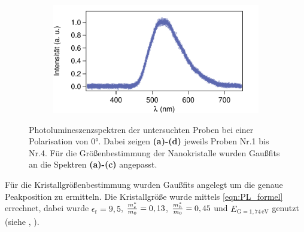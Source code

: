 \begin{figure}[H]
\begin{subfigure}{0.49\textwidth}
        \caption{}
        \label{fig:A3}
    \end{subfigure}
    \begin{subfigure}{0.49\textwidth}
        \includegraphics[width=\textwidth]{bilder/Nr4_Pol0.pdf}
        \caption{}
        \label{fig:A4}
    \end{subfigure}
    \caption{Photolumineszenzspektren der untersuchten Proben bei einer Polarisation von 0°. Dabei zeigen \textbf{(a)-(d)} jeweils Proben Nr.1 bis Nr.4. Für die Größenbestimmung der Nanokristalle wurden Gaußfits an die Spektren \textbf{(a)-(c)} angepasst.}
    \label{fig:Pol0}
\end{figure}
Für die Kristallgrößenbestimmung wurden Gaußfits angelegt um die genaue Peakposition zu ermitteln.
Die Kristallgröße wurde mittels \autoref{eqn:PL_formel} errechnet, dabei wurde $\epsilon_{\text{r}}=9,5$, $\frac{m_e^*}{m_{\text0}}=0,13$, $\frac{m_h^*}{m_{\text0}}=0,45$ und $E_{\text{G}=1,74\,\si{\electronvolt}}$ genutzt (siehe \cite{anleitung}, \cite{Manipulation}).

\begin{table}[H]
    \centering
    \caption{Mittels Gaußfit bestimmte Peakpositionen und errechnete Kristallgrößen für die Nanokristalle.}
    \label{tab:Kristallgroesse}
\end{table}

